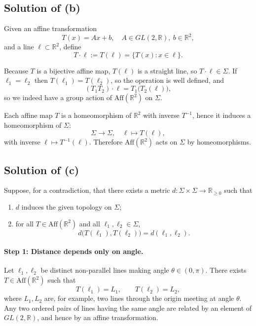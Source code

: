 \documentclass[12pt,a4paper]{article}
\theoremstyle{plain}
\theoremstyle{definition}      %
\begin{document}
	\subsection*{Solution of (b)}
	
	Given an affine transformation
	\[
	T(x) = A x + b, \quad A\in GL(2,\mathbb{R}),\ b\in\mathbb{R}^2,
	\]
	and a line $\ell\subset\mathbb{R}^2$, define
	\[
	T\cdot \ell := T(\ell) = \{T(x) : x\in\ell\}.
	\]
	
	Because $T$ is a bijective affine map, $T(\ell)$ is a straight line, so
	$T\cdot\ell\in\Sigma$.  If $\ell_1=\ell_2$ then $T(\ell_1)=T(\ell_2)$, so the
	operation is well defined, and 
	\[
	(T_1T_2)\cdot\ell = T_1\bigl(T_2(\ell)\bigr),
	\]
	so we indeed have a group action of $\mathrm{Aff}(\mathbb{R}^2)$ on $\Sigma$.
	
	Each affine map $T$ is a homeomorphism of $\mathbb{R}^2$ with inverse $T^{-1}$,
	hence it induces a homeomorphism of $\Sigma$:
	\[
	\Sigma\to\Sigma,\quad \ell\mapsto T(\ell),
	\]
	with inverse $\ell\mapsto T^{-1}(\ell)$.  Therefore
	$\mathrm{Aff}(\mathbb{R}^2)$ acts on $\Sigma$ by homeomorphisms.
	
	\subsection*{Solution of (c)}
	
	Suppose, for a contradiction, that there exists a metric
	$d:\Sigma\times\Sigma\to\mathbb{R}_{\ge 0}$ such that
	\begin{enumerate}
		\item $d$ induces the given topology on $\Sigma$;
		\item for all $T\in\mathrm{Aff}(\mathbb{R}^2)$ and all $\ell_1,\ell_2\in\Sigma$,
		\[
		d\bigl(T(\ell_1),T(\ell_2)\bigr) = d(\ell_1,\ell_2).
		\]
	\end{enumerate}
	
	\paragraph{Step 1: Distance depends only on angle.}
	Let $\ell_1,\ell_2$ be distinct non-parallel lines making angle $\theta\in(0,\pi)$.
	There exists $T\in\mathrm{Aff}(\mathbb{R}^2)$ such that
	\[
	T(\ell_1) = L_1,\qquad T(\ell_2) = L_2,
	\]
	where $L_1,L_2$ are, for example, two lines through the origin meeting at angle
	$\theta$.  Any two ordered pairs of lines having the same angle are related by an
	element of $GL(2,\mathbb{R})$, and hence by an affine transformation.
	
\end{document}
